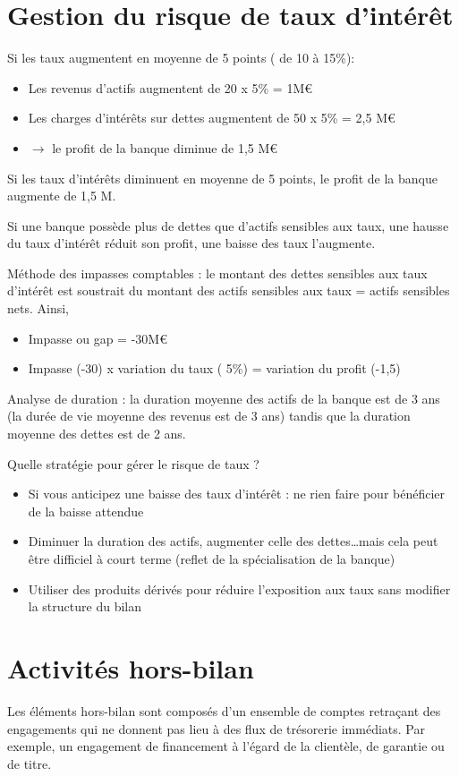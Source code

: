 \section{Gestion du risque de taux d'intérêt}

Si les taux augmentent en moyenne de 5 points ( de 10 à 15\%): 
\begin{itemize}
	\item Les revenus d'actifs augmentent de 20 x 5\% = 1M\euro
	\item Les charges d'intérêts sur dettes augmentent de 50 x 5\% = 2,5 M\euro
	\item $\rightarrow$ le profit de la banque diminue de 1,5 M\euro 
\end{itemize}


Si les taux d'intérêts diminuent en moyenne de 5 points, le profit de la banque augmente de 1,5 M.

Si une banque possède plus de dettes que d'actifs sensibles aux taux, une hausse du taux d'intérêt réduit son profit, une baisse des taux l'augmente.


Méthode des impasses comptables  : le montant des dettes sensibles aux taux d'intérêt est soustrait du montant des actifs sensibles aux taux = actifs sensibles nets. Ainsi,

\begin{itemize}
	\item Impasse ou gap = -30M\euro
	\item Impasse (-30) x variation du taux ( 5\%) = variation du profit (-1,5) 
\end{itemize}

Analyse de duration : la duration moyenne des actifs de la banque est de 3 ans (la durée de vie moyenne des revenus est de 3 ans) tandis que la duration moyenne des dettes est de 2 ans.
	
Quelle stratégie pour gérer le risque de taux ? 
\begin{itemize}
	\item Si vous anticipez une baisse des taux d’intérêt : ne rien faire pour bénéficier de la baisse attendue 
	\item Diminuer la duration des actifs, augmenter celle des dettes…mais cela peut être difficiel à court terme (reflet de la spécialisation de la banque) 
	\item Utiliser des produits dérivés pour réduire l'exposition aux taux sans modifier la structure du bilan
\end{itemize}

\section{Activités hors-bilan}

Les éléments hors-bilan sont composés d'un ensemble de comptes retraçant des engagements qui ne donnent pas lieu à des flux de trésorerie immédiats. Par exemple, un engagement de financement à l'égard de la clientèle, de garantie ou de titre.